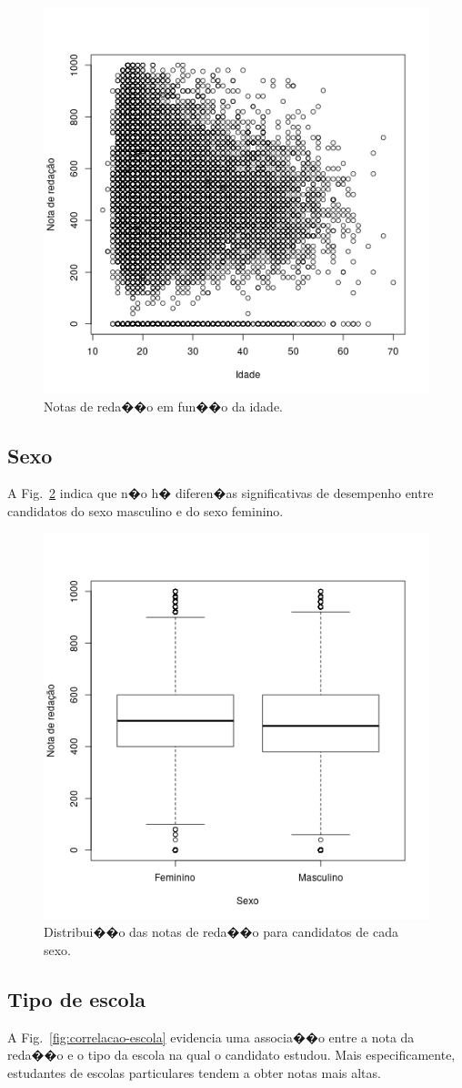 \documentclass[12pt]{article}
\newcommand{\reffig}[1]{Fig.~\ref{fig:#1}}
\begin{document}
\begin{figure}[H]
\centering\includegraphics[width=.6\linewidth]{../correlacao_idade.png}
\caption{Notas de reda��o em fun��o da idade.}
\label{fig:correlacao-idade}
\end{figure}

\subsection{Sexo}
A \reffig{correlacao-sexo} indica que n�o h� diferen�as significativas de desempenho entre candidatos do sexo masculino e do sexo feminino.

\begin{figure}[H]
\centering\includegraphics[width=.6\linewidth]{../correlacao_sexo.png}
\caption{Distribui��o das notas de reda��o para candidatos de cada sexo.}
\label{fig:correlacao-sexo}
\end{figure}

\subsection{Tipo de escola}
A \reffig{correlacao-escola} evidencia uma associa��o entre a nota da reda��o e o tipo da escola na qual o candidato estudou.
Mais especificamente, estudantes de escolas particulares tendem a obter notas mais altas.
\end{document}
